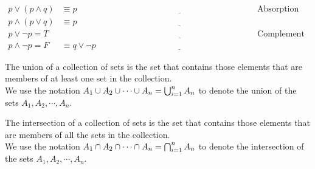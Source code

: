 \begin{exmp}
\begin{align}
p \lor (p \land q) & \equiv p &\underline{\hspace{5cm}}\hspace{1cm}& \text{Absorption Laws}\\
p \land (p \lor q)& \equiv p &\underline{\hspace{5cm}}\hspace{1cm}&\\
p \lor \lnot p= T  &\hspace{3cm}&\underline{\hspace{5cm}}\hspace{1cm}& \text{Complement Laws}\\
p \land \lnot p=F & \equiv q \lor \lnot p   &\underline{\hspace{5cm}}\hspace{1cm}&
\end{align}
\end{exmp}
\begin{defn}
The union of a collection of sets is the set that contains those elements that are members of
at least one set in the collection.\\
We use the notation
$A_1\cup A_2 \cup \cdots \cup A_n = \bigcup_{i=1}^{n}A_n$
to denote the union of the sets $A_1,A_2, \cdots, A_n$.
\end{defn}
\begin{defn}
The intersection of a collection of sets is the set that contains those elements that are members
of all the sets in the collection.\\
We use the notation
$A_1\cap A_2 \cap \cdots \cap A_n = \bigcap_{i=1}^{n}A_n$
to denote the intersection of the sets $A_1,A_2, \cdots, A_n$.
\end{defn}


